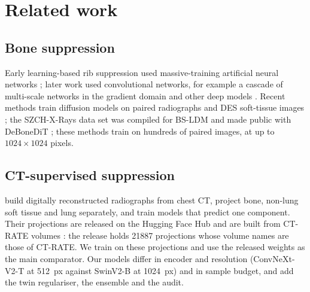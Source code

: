 \section{Related work}
\label{sec:related}
\subsection{Bone suppression}
Early learning-based rib suppression used massive-training artificial neural networks \citep{suzuki2006mtann}; later work used convolutional
networks, for example a cascade of multi-scale networks in the gradient domain \citep{yang2017cascade} and other deep models
\citep{gusarev2017deep}. Recent methods train diffusion models on paired radiographs and DES soft-tissue images
\citep{chen2024bsdiff,sun2026bsldm,sun2025gllcm,sun2026debonedit}; the SZCH-X-Rays data set was compiled for BS-LDM \citep{sun2026bsldm} and made
public with DeBoneDiT \citep{sun2026debonedit}; these methods train on hundreds of paired images, at up to $1024\times1024$ pixels.

\subsection{CT-supervised suppression}
\citet{angaitkar2026anatomy} build digitally reconstructed radiographs from chest CT, project bone, non-lung soft tissue and lung
separately, and train models that predict one component. Their projections are released on the Hugging Face Hub and are built from CT-RATE volumes
\citep{hamamci2026ctrate}: the release holds \num{21887} projections whose volume names are those of CT-RATE. We train on these projections and use the released weights as the main comparator. Our models differ in encoder and resolution (ConvNeXt-V2-T
at 512~px against SwinV2-B at 1024~px) and in sample budget, and add the twin regulariser, the ensemble and the audit.

